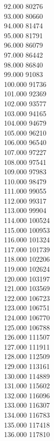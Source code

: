 { 92.000	80276 \\
 93.000	80660 \\
 94.000	81474 \\
 95.000	81791 \\
 96.000	86079 \\
 97.000	86442 \\
 98.000	86840 \\
 99.000	91083 \\
 100.000	91736 \\
 101.000	92369 \\
 102.000	93577 \\
 103.000	94165 \\
 104.000	94679 \\
 105.000	96210 \\
 106.000	96540 \\
 107.000	97227 \\
 108.000	97541 \\
 109.000	97983 \\
 110.000	98479 \\
 111.000	99055 \\
 112.000	99317 \\
 113.000	99904 \\
 114.000	100524 \\
 115.000	100953 \\
 116.000	101324 \\
 117.000	101739 \\
 118.000	102206 \\
 119.000	102624 \\
 120.000	103197 \\
 121.000	103569 \\
 122.000	106723 \\
 123.000	106751 \\
 124.000	106770 \\
 125.000	106788 \\
 126.000	111507 \\
 127.000	111911 \\
 128.000	112509 \\
 129.000	113161 \\
 130.000	114889 \\
 131.000	115602 \\
 132.000	116096 \\
 133.000	116307 \\
 134.000	116783 \\
 135.000	117418 \\
 136.000	117810 \\
}
